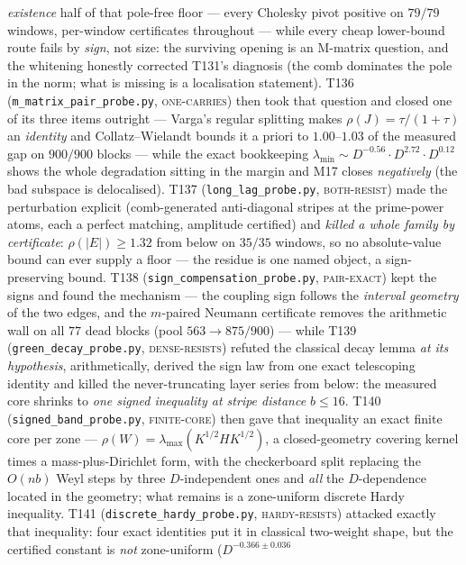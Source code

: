 \documentclass[11pt,a4paper]{article}
\begin{document}
\emph{existence} half of that pole-free floor --- every Cholesky pivot positive on
$79/79$ windows, per-window certificates throughout --- while every cheap lower-bound
route fails by \emph{sign}, not size: the surviving opening is an M-matrix question, and the whitening
honestly corrected T131's diagnosis (the comb dominates the pole in the norm; what is
missing is a localisation statement). T136 (\texttt{m\_matrix\_pair\_probe.py},
\textsc{one-carries}) then took that question and closed one of its three items outright ---
Varga's regular splitting makes $\rho(J)=\tau/(1+\tau)$ an \emph{identity} and Collatz--Wielandt
bounds it a priori to $1.00$--$1.03$ of the measured gap on $900/900$ blocks --- while the exact
bookkeeping $\lambda_{\min}\sim D^{-0.56}\cdot D^{2.72}\cdot D^{0.12}$ shows the whole degradation
sitting in the margin and M17 closes \emph{negatively} (the bad subspace is delocalised). T137
(\texttt{long\_lag\_probe.py}, \textsc{both-resist}) made the perturbation explicit (comb-generated
anti-diagonal stripes at the prime-power atoms, each a perfect matching, amplitude certified) and
\emph{killed a whole family by certificate}: $\rho(|E|)\ge1.32$ from below on $35/35$ windows, so no
absolute-value bound can ever supply a floor --- the residue is one named object, a sign-preserving
bound. T138 (\texttt{sign\_compensation\_probe.py}, \textsc{pair-exact}) kept the signs and found the
mechanism --- the coupling sign follows the \emph{interval geometry} of the two edges, and the
$m$-paired Neumann certificate removes the arithmetic wall on all $77$ dead blocks (pool
$563\to875/900$) --- while T139 (\texttt{green\_decay\_probe.py}, \textsc{dense-resists}) refuted the
classical decay lemma \emph{at its hypothesis}, arithmetically, derived the sign law from one exact
telescoping identity and killed the never-truncating layer series from below: the measured core
shrinks to \emph{one signed inequality at stripe distance $b\le16$}. T140
(\texttt{signed\_band\_probe.py}, \textsc{finite-core}) then gave that inequality an exact finite
core per zone --- $\rho(W)=\lambda_{\max}(K^{1/2}HK^{1/2})$, a closed-geometry covering kernel
times a mass-plus-Dirichlet form, with the checkerboard split replacing the $O(nb)$ Weyl steps by
three $D$-independent ones and \emph{all} the $D$-dependence located in the geometry; what remains
is a zone-uniform discrete Hardy inequality. T141 (\texttt{discrete\_hardy\_probe.py},
\textsc{hardy-resists}) attacked exactly that inequality: four exact identities put it in classical
two-weight shape, but the certified constant is \emph{not} zone-uniform ($D^{-0.366\pm0.036}$
\end{document}
